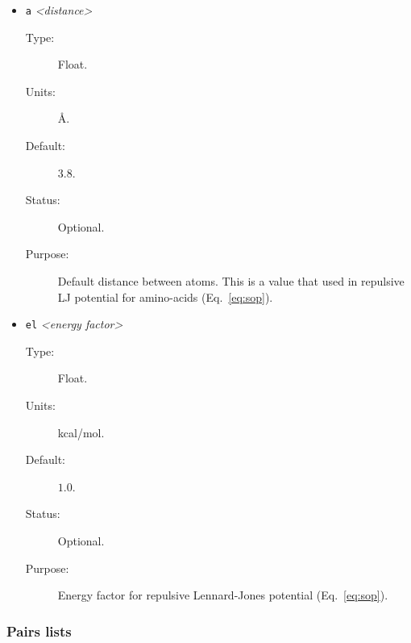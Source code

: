 \documentclass[a4paper]{article}
\begin{document}
\begin{itemize}
\item \texttt{a} \textit{\textless distance\textgreater}
\begin{description}
\item[Type:] Float.
\item[Units:] \AA.
\item[Default:] $3.8$.
\item[Status:] Optional.
\item[Purpose:] Default distance between atoms. This is a value that used in repulsive LJ potential for amino-acids (Eq.~\ref{eq:sop}).
\end{description}

\item \texttt{el} \textit{\textless energy factor\textgreater}
\begin{description}
\item[Type:] Float.
\item[Units:] kcal/mol.
\item[Default:] $1.0$.
\item[Status:] Optional.
\item[Purpose:] Energy factor for repulsive Lennard-Jones potential (Eq.~\ref{eq:sop}).
\end{description}
   
\end{itemize}


\subsubsection{Pairs lists}
\end{document}
